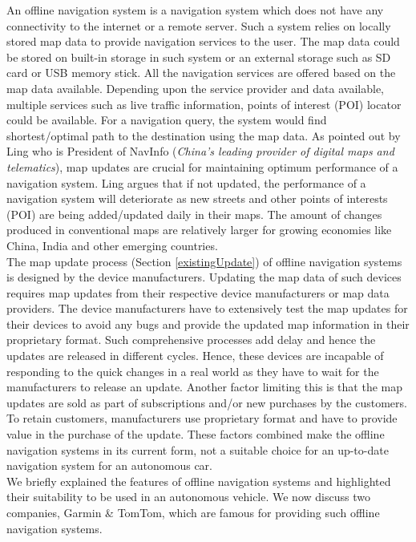 An offline navigation system is a navigation system which does not have any connectivity to the internet or a remote server. Such a system relies on locally stored map data to provide navigation services to the user. The map data could be stored on built-in storage in such system or an external storage such as SD card or USB memory stick. All the navigation services are offered based on the map data available. Depending upon the service provider and data available, multiple services such as live traffic information, points of interest (POI) locator could be available. For a navigation query, the system would find shortest/optimal path to the destination using the map data. As pointed out by Ling \cite{navinfo} who is President of NavInfo (\textit{China's leading provider of digital maps and telematics}), map updates are crucial for maintaining optimum performance of a navigation system. Ling argues that if not updated, the performance of a navigation system will deteriorate as new streets and other points of interests (POI) are being added/updated daily in their maps. The amount of changes produced in conventional maps are relatively larger for growing economies like China, India and other emerging countries. \\

The map update process (Section \ref{existingUpdate}) of offline navigation systems is designed by the device manufacturers. Updating the map data of such devices requires map updates from their respective device manufacturers or map data providers. The device manufacturers have to extensively test the map updates for their devices to avoid any bugs and provide the updated map information in their proprietary format. Such comprehensive processes add delay and hence the updates are released in different cycles. Hence, these devices are incapable of responding to the quick changes in a real world as they have to wait for the manufacturers to release an update. Another factor limiting this is that the map updates are sold as part of subscriptions and/or new purchases by the customers. To retain customers, manufacturers use proprietary format and have to provide value in the purchase of the update. These factors combined make the offline navigation systems in its current form, not a suitable choice for an up-to-date navigation system for an autonomous car. \\

We briefly explained the features of offline navigation systems and highlighted their suitability to be used in an autonomous vehicle. We now discuss two companies, Garmin \& TomTom, which are famous for providing such offline navigation systems.   
 
